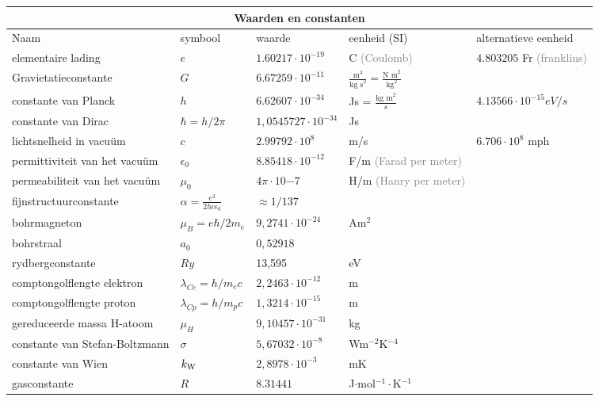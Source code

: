 \documentclass[dutch]{report}
\newcommand{\note}[1]{\textcolor{gray}{\tiny (#1)}}
\begin{document}
\centering
{
    \begin{tabular}{ l | l l l l}
        \hline
        \multicolumn{5}{c}{\huge{Waarden en constanten}} \\
        \hline
        Naam & symbool & waarde & eenheid (SI) & alternatieve eenheid \\
        \hline
        elementaire lading & $e$ & $1.60217\cdot 10^{-19}$ & C \note{Coulomb} & $4.803205$ Fr 
        \note{franklins}\\
        Gravietatieconstante & $G$ & $6.67259\cdot 10^{-11}$ & $\frac{\text{m}^3}{\text{kg s}^2} =
        \frac{\text{N m}^2}{\text{kg}^2}$ & \\
        constante van Planck & $h$ & $6.62607\cdot 10^{-34}$ & Js = $\frac{\text{kg m}^2}{s}$ &
        $4.13566\cdot10^{-15}eV/s$ \\
        constante van Dirac & $\hbar=h/2\pi$ & $1,0545727\cdot10^{-34}$ & Js & \\
        lichtsnelheid in vacu\"um & $c$ & $2.99792\cdot10^8$ & m/s & $6.706\cdot10^8$ mph\\ 
        permittiviteit van het vacu\"um & $\epsilon_0$ & $8.85418\cdot10^{-12}$ & F/m
        \note{Farad per meter} & \\
        permeabiliteit van het vacu\"um & $\mu_0$ & $4\pi\cdot10{-7}$ & H/m \note{Hanry per meter} &
        \\
        fijnstructuurconstante & $\alpha = \frac{e^2}{2hc\epsilon_0}$ & $\approx 1/137$ & & \\ %
        bohrmagneton & $\mu_{B}=e\hbar/2m_{e}$ & $9,2741\cdot10^{-24}$ & Am$^2$ & \\
        bohrstraal & $a_0$ & $0,52918$ & & \\
        rydbergconstante & $Ry$ & 13,595 & eV & \\
        comptongolflengte elektron & $\lambda_{Ce}=h/m_{e} c$ & $2,2463\cdot10^{-12}$
        & m & \\
        comptongolflengte proton & $\lambda_{Cp}=h/m_{p}c$ & $1,3214\cdot10^{-15}$
        & m & \\
        gereduceerde massa H-atoom & $\mu_{H}$ & $9,10457\cdot10^{-31}$ & kg & \\
        constante van Stefan-Boltzmann
        &$\sigma$ & $5,67032\cdot10^{-8}$ & Wm$^{-2}$K$^{-4}$ & \\
        constante van Wien & $k_{\rm W}$ & $2,8978\cdot10^{-3}$ & mK & \\
        \hline
        gasconstante & $R$ & $8.31441$ &J$\cdot$mol$^{-1}\cdot$K$^{-1}$ & \\

\end{tabular}}
\end{document}
